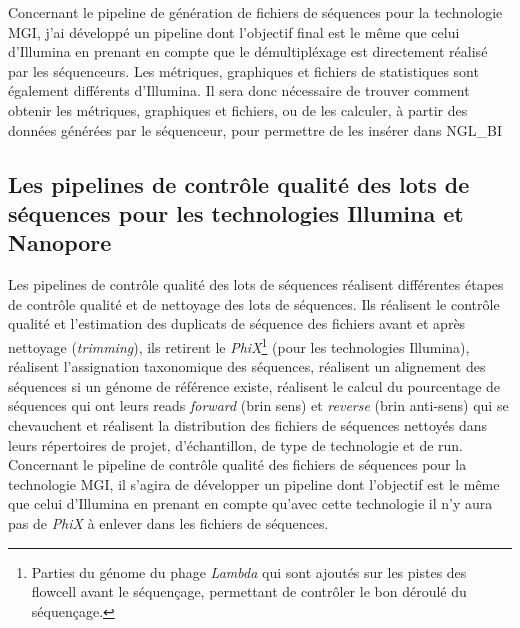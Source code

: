 Concernant le pipeline de génération de fichiers de séquences pour la technologie MGI, j'ai développé un pipeline dont l'objectif final est le même que celui d'Illumina en prenant en compte que le démultipléxage est directement réalisé par les séquenceurs. Les métriques, graphiques et fichiers de statistiques sont également différents d'Illumina. Il sera donc nécessaire de trouver comment obtenir les métriques, graphiques et fichiers, ou de les calculer, à partir des données générées par le séquenceur, pour permettre de les insérer dans NGL\_BI

\subsection{Les pipelines de contrôle qualité des lots de séquences pour les technologies Illumina et Nanopore}
Les pipelines de contrôle qualité des lots de séquences réalisent différentes étapes de contrôle qualité et de nettoyage des lots de séquences. Ils réalisent le contrôle qualité et l'estimation des duplicats de séquence des fichiers avant et après nettoyage (\emph{trimming}), ils retirent le \emph{PhiX}\footnote{Parties du génome du phage \emph{Lambda} qui sont ajoutés sur les pistes des flowcell avant le séquençage, permettant de contrôler le bon déroulé du séquençage.} (pour les technologies Illumina), réalisent l'assignation taxonomique des séquences, réalisent un alignement des séquences si un génome de référence existe, réalisent le calcul du pourcentage de séquences qui ont leurs reads \emph{forward} (brin sens) et \emph{reverse} (brin anti-sens) qui se chevauchent et réalisent la distribution des fichiers de séquences nettoyés dans leurs répertoires de projet, d'échantillon, de type de technologie et de run.\\

Concernant le pipeline de contrôle qualité des fichiers de séquences pour la technologie MGI, il s'agira de développer un pipeline dont l'objectif est le même que celui d'Illumina en prenant en compte qu'avec cette technologie il n'y aura pas de \emph{PhiX} à enlever dans les fichiers de séquences.

